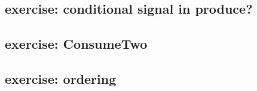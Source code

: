 
\subsection{exercise: conditional signal in produce?}


\subsection{exercise: ConsumeTwo}


\subsection{exercise: ordering}



